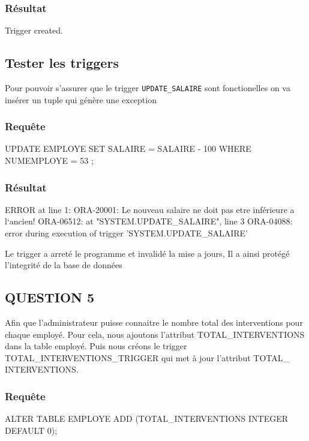 \documentclass[•]{article}
\begin{document}
\subsubsection{Résultat}
\begin{sql}
Trigger created.
\end{sql}

\subsection{Tester les triggers}
Pour pouvoir s'assurer que le trigger \texttt{UPDATE_SALAIRE} sont fonctionelles on va insérer un tuple qui génère une exception
\subsubsection{Requête}
\begin{sql}
UPDATE EMPLOYE SET SALAIRE = SALAIRE - 100 WHERE NUMEMPLOYE = 53 ;
\end{sql}

\subsubsection{Résultat}
\begin{sql}
ERROR at line 1:
ORA-20001: Le nouveau salaire ne doit pas etre inférieure a l`ancien!
ORA-06512: at "SYSTEM.UPDATE_SALAIRE", line 3
ORA-04088: error during execution of trigger 'SYSTEM.UPDATE_SALAIRE'
\end{sql}

Le trigger a arreté le programme et invalidé la mise a jours, Il a ainsi protégé l'integrité de la base de données

\subsection{QUESTION 5}
Afin que l’administrateur puisse connaitre le nombre total des interventions pour chaque employé. 
Pour cela, nous ajoutons l'attribut TOTAL_INTERVENTIONS dans la table employé.
Puis nous créons le trigger TOTAL_INTERVENTIONS_TRIGGER qui met à jour l’attribut TOTAL_ INTERVENTIONS.


\subsubsection{Requête}
\begin{sql}
ALTER TABLE EMPLOYE ADD (TOTAL_INTERVENTIONS INTEGER DEFAULT 0);
\end{sql}
\end{document}
